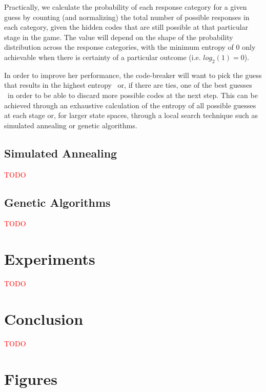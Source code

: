 \documentclass[11pt]{article}
\begin{document}
Practically, we calculate the probability of each response category for a given guess by counting (and normalizing) the total number of possible responses in each category, given the hidden codes that are still possible at that particular stage in the game. The value will depend on the shape of the probability distribution across the response categories, with the minimum entropy of $0$ only achievable when there is certainty of a particular outcome (i.e. $log_2(1)=0$).

In order to improve her performance, the code-breaker will want to pick the guess that results in the highest entropy \textendash \ or, if there are ties, one of the best guesses \textendash \ in order to be able to discard more possible codes at the next step. This can be achieved through an exhaustive calculation of the entropy of all possible guesses at each stage or, for larger state spaces, through a local search technique such as simulated annealing or genetic algorithms. 

\subsection{Simulated Annealing}

\noindent \textcolor{red}{TODO}

\subsection{Genetic Algorithms}

\noindent \textcolor{red}{TODO}

\section{Experiments}

\noindent \textcolor{red}{TODO}

\section{Conclusion}

\noindent \textcolor{red}{TODO}


\newpage
\appendix

\section{Figures}
\end{document}
